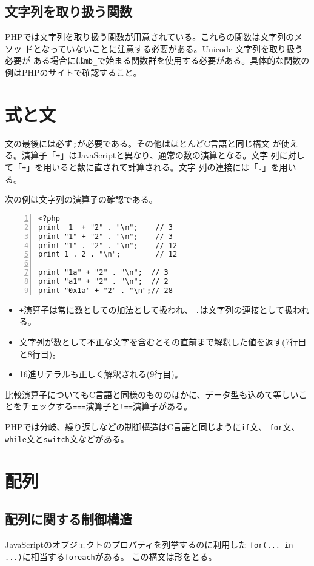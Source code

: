 \subsection{文字列を取り扱う関数}
PHPでは文字列を取り扱う関数が用意されている。これらの関数は文字列のメソッ
ドとなっていないことに注意する必要がある。Unicode 文字列を取り扱う必要が
ある場合には\Verb+mb_+で始まる関数群を使用する必要がある。具体的な関数の
例はPHPのサイトで確認すること。
\section{式と文}
文の最後には必ず\texttt{;}が必要である。その他はほとんどC言語と同じ構文
が使える。演算子「\texttt{+}」はJavaScriptと異なり、通常の数の演算となる。文字
列に対して「\texttt{+}」を用いると数に直されて計算される。文字
列の連接には「\texttt{.}」を用いる。
\begin{Exec}\upshape
次の例は文字列の演算子の確認である。
\begin{Verbatim}[numbers=left]
<?php
print  1  + "2" . "\n";    // 3
print "1" + "2" . "\n";    // 3
print "1" . "2" . "\n";    // 12
print 1 . 2 . "\n";        // 12

print "1a" + "2" . "\n";  // 3
print "a1" + "2" . "\n";  // 2
print "0x1a" + "2" . "\n";// 28
\end{Verbatim}
\begin{itemize}
 \item \texttt{+}演算子は常に数としての加法として扱われ、
 \texttt{.}は文字列の連接として扱われる。
 \item 文字列が数として不正な文字を含むとその直前まで解釈した値を返す(7行目と8行目)。
 \item 16進リテラルも正しく解釈される(9行目)。
\end{itemize}
\end{Exec}
比較演算子についてもC言語と同様のもののほかに、データ型も込めて等しいこ
とをチェックする\texttt{===}演算子と\texttt{!==}演算子がある。



PHPでは分岐、繰り返しなどの制御構造はC言語と同じように\texttt{if}文、
\texttt{for}文、\texttt{while}文と\texttt{switch}文などがある。

\section{配列}
\subsection{配列に関する制御構造}
JavaScriptのオブジェクトのプロパティを列挙するのに利用した
\texttt{for(... in ...)}に相当する\texttt{foreach}がある。
この構文は形をとる。

